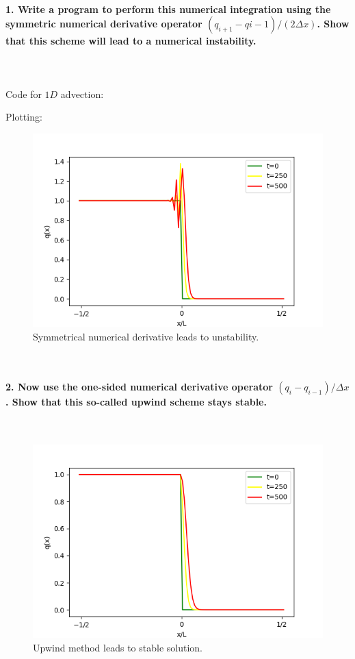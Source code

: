 \paragraph{1. Write a program to perform this numerical 
    integration using the symmetric numerical derivative 
    operator $(q_{i+1}-q{i-1})/(2\Delta x)$. Show that this 
    scheme will lead to a numerical instability.
} \ \\
    \\
    Code for $1D$ advection:
    
    \newpage\noindent
    Plotting:
    
    \begin{figure}[h!]
        \centering
        \includegraphics[width=.6\textwidth]{../figures/symmetric_1.png}
        \caption{Symmetrical numerical derivative leads to unstability.}
    \end{figure} \ \\ 

\newpage
\paragraph{2. Now use the one-sided numerical derivative 
    operator $(q_i-q_{i-1})/\Delta x$. Show that this 
    so-called upwind scheme stays stable.
} \ \\
    \begin{figure}[h!]
        \centering
        \includegraphics[width=.6\textwidth]{../figures/upwind_2.png}
        \caption{Upwind method leads to stable solution.}
    \end{figure} \ \\ 

